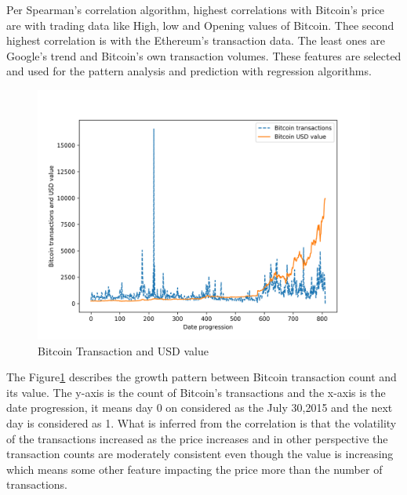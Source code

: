 \documentclass[sigconf]{acmart}
\begin{document}
Per Spearman's correlation algorithm, highest correlations with Bitcoin's price are with trading data like High, low and Opening values of Bitcoin. Thee second highest correlation is with the Ethereum's transaction data. The least ones are Google's trend and Bitcoin's own transaction volumes.
These features are selected and used for the pattern analysis and prediction with regression algorithms. 


\begin{figure}[!ht]
  \centering\includegraphics[width=\columnwidth]{images/BTC-prcvsBTC-trans.png}
  \caption{Bitcoin Transaction and USD value }
  \label{1}
\end{figure}

The Figure\ref{1} describes the growth pattern between Bitcoin transaction count and its value. The y-axis is the count of Bitcoin's transactions and the x-axis is the date progression, it means day 0 on considered as the July 30,2015 and the next day is considered as 1. What is inferred from the correlation is that the volatility of the transactions increased as the price increases and in other perspective the transaction counts are moderately consistent even though the value is increasing which means some other feature impacting the price more than the number of transactions. 
\end{document}
